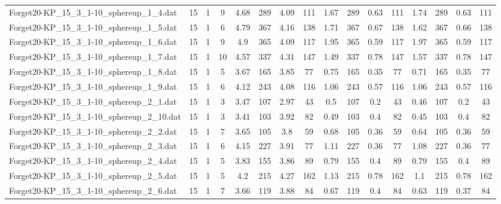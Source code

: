 \begin{sidewaystable}[!ht]
{\begin{tabular}{lccccccccccccccc}
Forget20-KP\_15\_3\_1-10\_sphereup\_1\_4.dat & 15 & 1 & 9 & 4.68 & 289 & 4.09 & 111 & 1.67 & 289 &  \textcolor{blue2}{0.63} & 111 & 1.74 & 289 &  \textcolor{blue2}{0.63} & 111 \\
Forget20-KP\_15\_3\_1-10\_sphereup\_1\_5.dat & 15 & 1 & 6 & 4.79 & 367 & 4.16 & 138 & 1.71 & 367 & 0.67 & 138 & 1.62 & 367 &  \textcolor{blue2}{0.66} & 138 \\
Forget20-KP\_15\_3\_1-10\_sphereup\_1\_6.dat & 15 & 1 & 9 & 4.9 & 365 & 4.09 & 117 & 1.95 & 365 &  \textcolor{blue2}{0.59} & 117 & 1.97 & 365 &  \textcolor{blue2}{0.59} & 117 \\
Forget20-KP\_15\_3\_1-10\_sphereup\_1\_7.dat & 15 & 1 & 10 & 4.57 & 337 & 4.31 & 147 & 1.49 & 337 &  \textcolor{blue2}{0.78} & 147 & 1.57 & 337 &  \textcolor{blue2}{0.78} & 147 \\
Forget20-KP\_15\_3\_1-10\_sphereup\_1\_8.dat & 15 & 1 & 5 & 3.67 & 165 & 3.85 & 77 & 0.75 & 165 &  \textcolor{blue2}{0.35} & 77 & 0.71 & 165 &  \textcolor{blue2}{0.35} & 77 \\
Forget20-KP\_15\_3\_1-10\_sphereup\_1\_9.dat & 15 & 1 & 6 & 4.12 & 243 & 4.08 & 116 & 1.06 & 243 &  \textcolor{blue2}{0.57} & 116 & 1.06 & 243 &  \textcolor{blue2}{0.57} & 116 \\
Forget20-KP\_15\_3\_1-10\_sphereup\_2\_1.dat & 15 & 1 & 3 & 3.47 & 107 & 2.97 & 43 & 0.5 & 107 &  \textcolor{blue2}{0.2} & 43 & 0.46 & 107 &  \textcolor{blue2}{0.2} & 43 \\
Forget20-KP\_15\_3\_1-10\_sphereup\_2\_10.dat & 15 & 1 & 3 & 3.41 & 103 & 3.92 & 82 & 0.49 & 103 & 0.4 & 82 & 0.45 & 103 & 0.4 & 82 \\
Forget20-KP\_15\_3\_1-10\_sphereup\_2\_2.dat & 15 & 1 & 7 & 3.65 & 105 & 3.8 & 59 & 0.68 & 105 &  \textcolor{blue2}{0.36} & 59 & 0.64 & 105 &  \textcolor{blue2}{0.36} & 59 \\
Forget20-KP\_15\_3\_1-10\_sphereup\_2\_3.dat & 15 & 1 & 6 & 4.15 & 227 & 3.91 & 77 & 1.11 & 227 &  \textcolor{blue2}{0.36} & 77 & 1.08 & 227 &  \textcolor{blue2}{0.36} & 77 \\
Forget20-KP\_15\_3\_1-10\_sphereup\_2\_4.dat & 15 & 1 & 5 & 3.83 & 155 & 3.86 & 89 & 0.79 & 155 & 0.4 & 89 & 0.79 & 155 & 0.4 & 89 \\
Forget20-KP\_15\_3\_1-10\_sphereup\_2\_5.dat & 15 & 1 & 5 & 4.2 & 215 & 4.27 & 162 & 1.13 & 215 & 0.78 & 162 & 1.1 & 215 & 0.78 & 162 \\
Forget20-KP\_15\_3\_1-10\_sphereup\_2\_6.dat & 15 & 1 & 7 & 3.66 & 119 & 3.88 & 84 & 0.67 & 119 & 0.4 & 84 & 0.63 & 119 &  \textcolor{blue2}{0.37} & 84 \\

\end{tabular}}
\end{sidewaystable}
